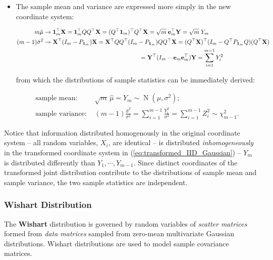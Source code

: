 \documentclass[12pt, twoside, draft]{article}
\begin{document}
\begin{itemize}
\item The sample mean and variance are expressed more simply in the new coordinate system:

\begin{align}
m \hat{\mu} &\rightarrow \boldsymbol{1}_m^\top \mathbf{X} = \boldsymbol{1}_m^\top Q Q^\top \mathbf{X} = (Q^\top \boldsymbol{1}_m)^\top Q^\top \mathbf{X} = \sqrt{m} \; \mathbf{e}_m^\top \mathbf{Y} = \sqrt{m} \; Y_m \\
(m-1)\hat{\sigma}^2 &\rightarrow \mathbf{X}^\top (I_m - P_{\boldsymbol{1}_m}) \mathbf{X} = \mathbf{X}^\top QQ^\top (I_m - P_{\boldsymbol{1}_m}) QQ^\top \mathbf{X} = (Q^\top \mathbf{X})^\top (I_m - Q^\top P_{\boldsymbol{1}_m} Q) (Q^\top \mathbf{X}) \notag \\
&\hspace{160pt}= \mathbf{Y}^\top (I_m - \mathbf{e}_m \mathbf{e}_m^\top) \mathbf{Y} = \sum_{i=1}^{m-1} Y_i^2
\end{align}

from which the distributions of sample statistics can be immediately derived:

\begin{align}
\text{sample mean: } &\sqrt{m} \, \hat{\mu} = Y_m \sim \operatorname{N}\left(\mu, \sigma^2 \right); \\
\text{sample variance: } &(m-1)\frac{\hat{\sigma}^2 }{\sigma^2} =  \sum_{i = 1}^{m-1} \frac{Y_i^2}{\sigma^2} = \sum_{i=1}^{m-1} Z_i^2 \sim \chi_{m-1}^2.
\end{align}

\end{itemize}

Notice that information distributed homogenously in the original coordinate system -- all random variables, $X_i$, are identical -- is distributed \textit{inhomogeneously} in the transformed coordinate system in (\ref{eq:transformed_IID_Gaussian}) -- $Y_m$ is distributed differently than $Y_1, \cdots, Y_{m-1}$.  Since distinct coordinates of the transformed joint distribution contribute to the distributions of sample mean and sample variance, the two sample statistics are independent.



\subsubsection{Wishart Distribution}\label{sec:Wishart_distribution}
The \textbf{Wishart} distribution is governed by random variables of \textit{scatter matrices} formed from \textit{data matrices} sampled from zero-mean multivariate Gaussian distributions.  Wishart distributions are used to model sample covariance matrices.
\end{document}
